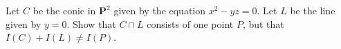 Let $C$ be the conic in $\mathbf{P}^2$ given by the equation $x^2 - yz = 0$. Let $L$ be the line given by $y = 0$. Show that $C \cap L$ consists of one point $P$, but that $I(C) + I(L) \neq I(P)$.
